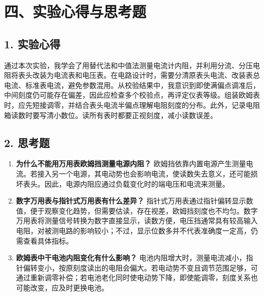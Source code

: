 \section*{四、实验心得与思考题}

\subsection*{1. 实验心得}

通过本次实验，我学会了用替代法和中值法测量电流计内阻，并利用分流、分压电阻将表头改装为电流表和电压表。在电路设计时，需要分清原表头电流、改装表总电流、标准表电流，避免参数混用。从校验结果中，我意识到即使满偏点调准后，中间刻度仍可能存在偏差，因此应检查多个校验点，再评定仪表等级。组装欧姆表时，应先短接调零，并结合表头电流半偏点理解电阻刻度的分布。此外，记录电阻箱读数时要写清小数位。读所有表时都要正视刻度，减小读数误差。

\subsection*{2. 思考题}

\begin{enumerate}
\item \textbf{为什么不能用万用表欧姆挡测量电源内阻？} 欧姆挡依靠内置电源产生测量电流。若接入另一个电源，其电动势也会影响电流，使读数失去意义，还可能损坏表头。因此，电源内阻应通过负载变化时的端电压和电流来测量。

\item \textbf{数字万用表与指针式万用表有什么差异？} 指针式万用表通过指针偏转显示数值，便于观察变化趋势，但需要估读，存在视差，欧姆挡刻度也不均匀。数字万用表将测量信号转换为数字直接显示，读数方便，电压挡通常具有较高输入电阻，对被测电路的影响较小；不过，显示位数多并不代表准确度一定高，仍需查看具体指标。

\item \textbf{欧姆表中干电池内阻变化有什么影响？} 电池内阻增大时，测量电流减小，指针偏转变小，按原刻度读出的电阻会偏大。若电动势不变且调节范围足够，可通过重新调零补偿；若电池老化同时使电动势下降，即使能调零，刻度关系也可能改变，应及时更换电池。
\end{enumerate}
